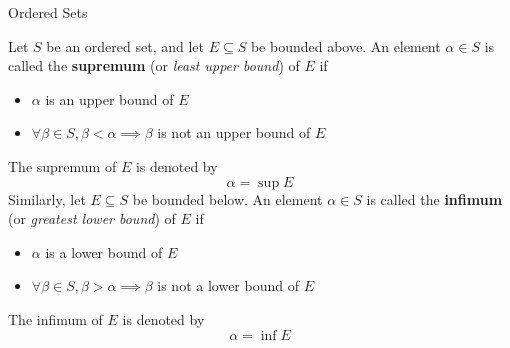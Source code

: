 \begin{section}{Ordered Sets}
\begin{definition} \label{def:SupremumInfimum}
    Let $S$ be an ordered set, and let $E \subseteq S$ be bounded above.
    An element $\alpha \in S$ is called the \textbf{supremum} (or \emph{least upper bound}) of $E$ if
    \begin{itemize}
        \item $\alpha$ is an upper bound of $E$
        \item $\forall \beta \in S, \beta < \alpha \implies \beta$ is not an upper bound of $E$
    \end{itemize}
    The supremum of $E$ is denoted by
    \[
    \alpha = \sup E
    \]
    Similarly, let $E \subseteq S$ be bounded below.
    An element $\alpha \in S$ is called the \textbf{infimum} (or \emph{greatest lower bound}) of $E$ if
    \begin{itemize}
        \item $\alpha$ is a lower bound of $E$
        \item $\forall \beta \in S, \beta > \alpha \implies \beta$ is not a lower bound of $E$
    \end{itemize}
    The infimum of $E$ is denoted by
    \[
    \alpha = \inf E
    \]
\end{definition}

\bigskip


\end{section}
